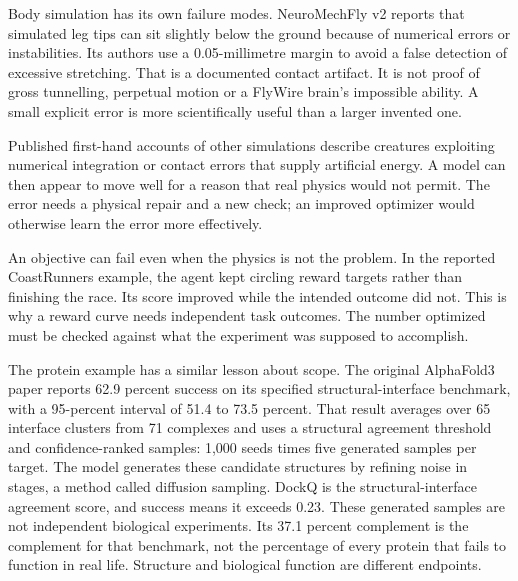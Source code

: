 Body simulation has its own failure modes. NeuroMechFly v2 reports that simulated
leg tips can sit slightly below the ground because of numerical errors or
instabilities. Its authors use a 0.05-millimetre margin to avoid a false detection
of excessive stretching.\cite{neuromechfly2024} That is a documented contact
artifact. It is not proof of gross tunnelling, perpetual motion or a FlyWire
brain's impossible ability. A small explicit error is more scientifically
useful than a larger invented one.

Published first-hand accounts of other simulations describe creatures exploiting
numerical integration or contact errors that supply artificial energy. A model
can then appear to move well for a reason that real physics would not permit.
The error needs a physical repair and a new check; an improved optimizer would
otherwise learn the error more effectively.\cite{surprises2018}

An objective can fail even when the physics is not the problem. In the reported
CoastRunners example, the agent kept circling reward targets rather than finishing
the race. Its score improved while the intended outcome did not.\cite{specgaming2020}
This is why a reward curve needs independent task outcomes. The number optimized
must be checked against what the experiment was supposed to accomplish.

The protein example has a similar lesson about scope. The original AlphaFold3
paper reports 62.9 percent success on its specified structural-interface benchmark,
with a 95-percent interval of 51.4 to 73.5 percent. That result averages over
65 interface clusters from 71 complexes and uses a structural agreement threshold
and confidence-ranked samples: 1,000 seeds times five generated samples per
target. The model generates these candidate structures by refining noise in
stages, a method called diffusion sampling. DockQ is the structural-interface agreement score, and success means
it exceeds 0.23. These generated samples are not independent biological
experiments. Its 37.1 percent complement is the complement
for that benchmark, not the percentage of every protein that fails to function
in real life. Structure and biological function are different endpoints.\cite{alphafold32024}

